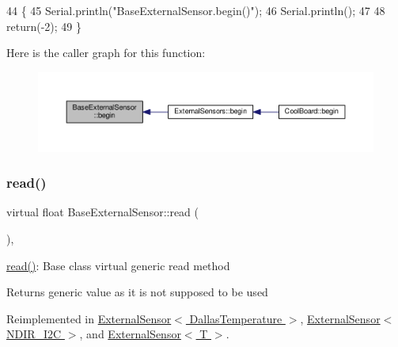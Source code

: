 \begin{DoxyCode}
44     \{
45         Serial.println(\textcolor{stringliteral}{"BaseExternalSensor.begin()"});
46         Serial.println();
47 
48         \textcolor{keywordflow}{return}(-2);
49     \}
\end{DoxyCode}
Here is the caller graph for this function\+:\nopagebreak
\begin{figure}[H]
\begin{center}
\leavevmode
\includegraphics[width=350pt]{classBaseExternalSensor_a87d132803d4f4fdd4e66332809f0c9a0_icgraph}
\end{center}
\end{figure}
\mbox{\label{classBaseExternalSensor_a1564f16deacf57b51b9948ac29db4291}} 
\subsubsection{\texorpdfstring{read()}{read()}}
{\footnotesize\ttfamily virtual float Base\+External\+Sensor\+::read (\begin{DoxyParamCaption}{ }\end{DoxyParamCaption})\hspace{0.3cm}{\ttfamily [inline]}, {\ttfamily [virtual]}}

\hyperlink{classBaseExternalSensor_a1564f16deacf57b51b9948ac29db4291}{read()}\+: Base class virtual generic read method

\begin{DoxyReturn}{Returns}
generic value as it is not supposed to be used 
\end{DoxyReturn}


Reimplemented in \hyperlink{classExternalSensor_3_01DallasTemperature_01_4_a1e725d9338314515d4e5dc456ed6a6c8}{External\+Sensor$<$ Dallas\+Temperature $>$}, \hyperlink{classExternalSensor_3_01NDIR__I2C_01_4_a239d18652e9fb4673842ae9726edf44f}{External\+Sensor$<$ N\+D\+I\+R\+\_\+\+I2\+C $>$}, and \hyperlink{classExternalSensor_a5fb3afc7d244fb86dac68ab5481bc407}{External\+Sensor$<$ T $>$}.



